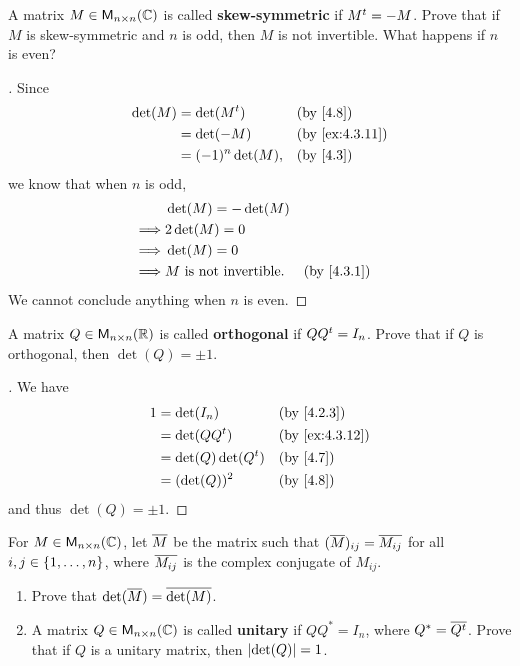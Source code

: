 \begin{ex}\label{ex:4.3.11}
	A matrix \(M \in \mathsf{M}_{{n} \times n}({\mathbb{C}})\) is called \textbf{skew-symmetric} if \({M}^{t} = -M\).
	Prove that if \(M\) is skew-symmetric and \(n\) is odd, then \(M\) is not invertible.
	What happens if \(n\) is even?
\end{ex}

\begin{proof}[]
	Since
	\begin{align*}
		\det(M) & = \det(\tp{M})    &  & \by{4.8}       \\
		        & = \det(-M)        &  & \by{ex:4.3.11} \\
		        & = (-1)^n \det(M), &  & \by{4.3}
	\end{align*}
	we know that when \(n\) is odd,
	\begin{align*}
		         & \det(M) = -\det(M)                           \\
		\implies & 2 \det(M) = 0                                \\
		\implies & \det(M) = 0                                  \\
		\implies & M \text{ is not invertible}. &  & \by{4.3.1}
	\end{align*}
	We cannot conclude anything when \(n\) is even.
\end{proof}

\begin{ex}\label{ex:4.3.12}
	A matrix \(Q \in \mathsf{M}_{{n} \times n}({\mathbb{R}})\) is called \textbf{orthogonal} if \(Q {Q}^{t} = I_n\).
	Prove that if \(Q\) is orthogonal, then \(\det(Q) = \pm 1\).
\end{ex}

\begin{proof}[]
	We have
	\begin{align*}
		1 & = \det(I_n)            &  & \by{4.2.3}     \\
		  & = \det(Q \tp{Q})       &  & \by{ex:4.3.12} \\
		  & = \det(Q) \det(\tp{Q}) &  & \by{4.7}       \\
		  & = (\det(Q))^2          &  & \by{4.8}
	\end{align*}
	and thus \(\det(Q) = \pm 1\).
\end{proof}

\begin{ex}\label{ex:4.3.13}
	For \(M \in \mathsf{M}_{{n} \times n}({\mathbb{C}})\), let \(\overline{M}\) be the matrix such that \((\overline{M})_{i j} = \overline{M_{i j}}\) for all \(i, j \in \left\lbrace1, \dots, n\right\rbrace\), where \(\overline{M_{i j}}\) is the complex conjugate of \(M_{i j}\).
	\begin{enumerate}
		\item Prove that \(\det(\overline{M}) = \overline{\det(M)}\).
		\item A matrix \(Q \in \mathsf{M}_{{n} \times n}({\mathbb{C}})\) is called \textbf{unitary} if \(Q Q^* = I_n\), where \(Q^* = \overline{{Q}^{t}}\).
		      Prove that if \(Q\) is a unitary matrix, then \(\left\lvert\det(Q)\right\rvert = 1\).
	\end{enumerate}
\end{ex}

